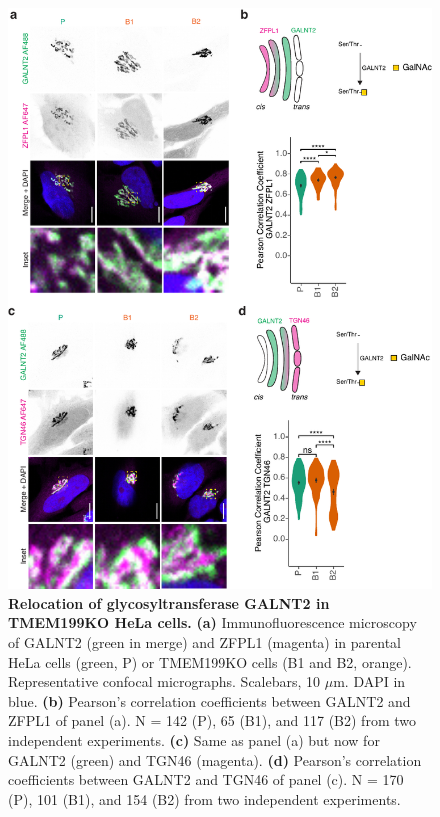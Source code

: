 \clearpage

\begin{figure}
    \includegraphics[keepaspectratio=true,width=\textwidth,height=\textheight]{chapters/chapter4/chapter4_SupplementaryFigure3.pdf}
    \caption{\textbf{Relocation of glycosyltransferase GALNT2 in TMEM199KO HeLa cells.} \textbf{(a)} Immunofluorescence microscopy of GALNT2 (green in merge) and ZFPL1 (magenta) in parental HeLa cells (green, P) or TMEM199KO cells (B1 and B2, orange). Representative confocal micrographs. Scalebars, 10 $\mu$m. DAPI in blue. \textbf{(b)} Pearson’s correlation coefficients between GALNT2 and ZFPL1 of panel (a). N = 142 (P), 65 (B1), and 117 (B2) from two independent experiments. \textbf{(c)} Same as panel (a) but now for GALNT2 (green) and TGN46 (magenta). \textbf{(d)} Pearson’s correlation coefficients between GALNT2 and TGN46 of panel (c). N = 170 (P), 101 (B1), and 154 (B2) from two independent experiments.}
    \label{fig:ch4supfig3}
\end{figure}

